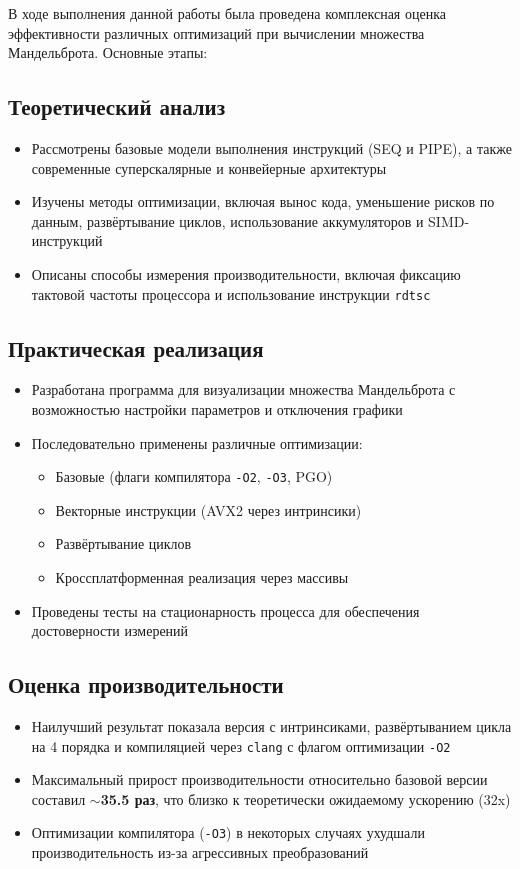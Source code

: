 \documentclass[12pt,a4paper]{article}
\begin{document}
В ходе выполнения данной работы была проведена комплексная оценка эффективности различных оптимизаций при вычислении множества Мандельброта. Основные этапы:

\subsection{Теоретический анализ}
\begin{itemize}
    \item Рассмотрены базовые модели выполнения инструкций (SEQ и PIPE), а также современные суперскалярные и конвейерные архитектуры
    \item Изучены методы оптимизации, включая вынос кода, уменьшение рисков по данным, развёртывание циклов, использование аккумуляторов и SIMD-инструкций
    \item Описаны способы измерения производительности, включая фиксацию тактовой частоты процессора и использование инструкции \texttt{rdtsc}
\end{itemize}

\subsection{Практическая реализация}
\begin{itemize}
    \item Разработана программа для визуализации множества Мандельброта с возможностью настройки параметров и отключения графики
    \item Последовательно применены различные оптимизации:
    \begin{itemize}
        \item Базовые (флаги компилятора \texttt{-O2}, \texttt{-O3}, PGO)
        \item Векторные инструкции (AVX2 через интринсики)
        \item Развёртывание циклов
        \item Кроссплатформенная реализация через массивы
    \end{itemize}
    \item Проведены тесты на стационарность процесса для обеспечения достоверности измерений
\end{itemize}

\subsection{Оценка производительности}
\begin{itemize}
    \item Наилучший результат показала версия с интринсиками, развёртыванием цикла на 4 порядка и компиляцией через \texttt{clang} с флагом оптимизации \texttt{-O2}
    \item Максимальный прирост производительности относительно базовой версии составил \textbf{$\sim$35.5 раз}, что близко к теоретически ожидаемому ускорению (32x)
    \item Оптимизации компилятора (\texttt{-O3}) в некоторых случаях ухудшали производительность из-за агрессивных преобразований
\end{itemize}
\end{document}
